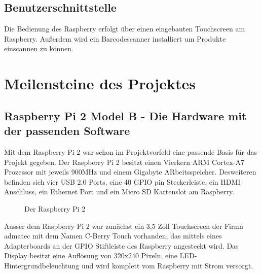 \documentclass[11pt,a4paper]{article} %
\begin{document}
\subsection{Benutzerschnittstelle}
Die Bedienung des Raspberry erfolgt über einen eingebauten Touchscreen am Raspberry. Außerdem wird ein Barcodescanner installiert um Produkte einscannen zu können.

\newpage


\section{Meilensteine des Projektes}
\label{Meilensteine}

\subsection{Raspberry Pi 2 Model B - Die Hardware mit der passenden Software}
Mit dem Raspberry Pi 2 war schon im Projektvorfeld eine passende Basis für das Projekt gegeben. Der Raspberry Pi 2 besitzt einen Vierkern ARM Cortex-A7 Prozessor mit jeweils 900MHz und einem Gigabyte ARbeitsspeicher. Desweiteren befinden sich vier USB 2.0 Ports, eine 40 GPIO pin Steckerleiste, ein HDMI Anschluss, ein Ethernet Port und ein Micro SD Kartenslot am Raspberry.
	\begin{figure}[h]
	\caption{Der Raspberry Pi 2}
	\end{figure}
\par
Ausser dem Raspberry Pi 2 war zunächst ein 3,5 Zoll Touchscreen der Firma admatec \cite{10} mit dem Namen C-Berry Touch vorhanden, das mittels eines Adapterboards an der GPIO Stiftleiste des Raspberry angesteckt wird. Das Display besitzt eine Auflösung von 320x240 Pixeln, eine LED- Hintergrundbeleuchtung und wird komplett vom Raspberry mit Strom versorgt.
\par
\end{document}
